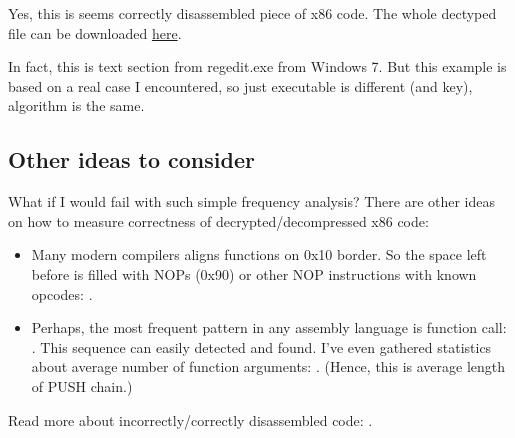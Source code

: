Yes, this is seems correctly disassembled piece of x86 code.
The whole dectyped file can be downloaded \href{https://github.com/DennisYurichev/RE-for-beginners/blob/master/examples/simple_exec_crypto/files/decrypted.bin}{here}.

In fact, this is text section from regedit.exe from Windows 7.
But this example is based on a real case I encountered, so just executable is different (and key), algorithm is the same.

\subsection{Other ideas to consider}

What if I would fail with such simple frequency analysis?
There are other ideas on how to measure correctness of decrypted/decompressed x86 code:

\begin{itemize}

\item Many modern compilers aligns functions on 0x10 border.
So the space left before is filled with NOPs (0x90) or other NOP instructions with known opcodes: .

\item Perhaps, the most frequent pattern in any assembly language is function call:\\
.
This sequence can easily detected and found.
I've even gathered statistics about average number of function arguments: .
(Hence, this is average length of PUSH chain.)

\end{itemize}

Read more about incorrectly/correctly disassembled code: .
